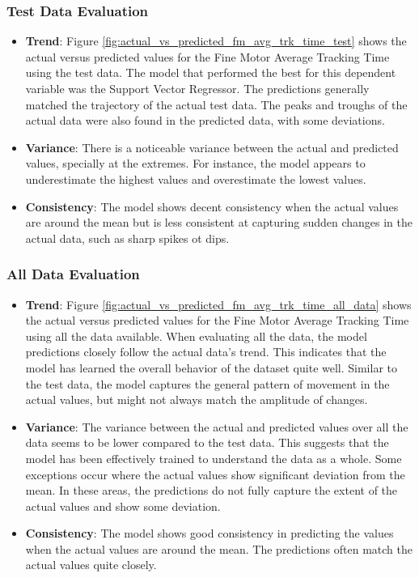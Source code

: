 \subsubsection*{Test Data Evaluation}

\begin{itemize}
    \item \textbf{Trend}: Figure \ref{fig:actual_vs_predicted_fm_avg_trk_time_test} shows the actual versus predicted values for the Fine Motor Average Tracking Time using the test data. The model that performed
          the best for this dependent variable was the Support Vector Regressor. The predictions generally matched the trajectory of the actual test data. The peaks and troughs of the
          actual data were also found in the predicted data, with some deviations.
    \item \textbf{Variance}: There is a noticeable variance between the actual and predicted values, specially at the extremes. For instance, the model appears to underestimate the highest values
          and overestimate the lowest values.
    \item \textbf{Consistency}: The model shows decent consistency when the actual values are around the mean but is less consistent at capturing sudden changes in the actual data, such as sharp spikes ot dips.
\end{itemize}

\subsubsection*{All Data Evaluation}

\begin{itemize}
    \item \textbf{Trend}: Figure \ref{fig:actual_vs_predicted_fm_avg_trk_time_all_data} shows the actual versus predicted values for the Fine Motor Average Tracking Time using all the data
          available. When evaluating all the data, the model predictions closely follow the actual data's trend. This indicates that the model has learned the overall behavior of the dataset quite well.
          Similar to the test data, the model captures the general pattern of movement in the actual values, but might not always match the amplitude of changes.
    \item \textbf{Variance}: The variance between the actual and predicted values over all the data seems to be lower compared to the test data. This suggests that the model has been
          effectively trained to understand the data as a whole. Some exceptions occur where the actual values show significant deviation from the mean. In these areas, the predictions do not fully
          capture the extent of the actual values and show some deviation.
    \item \textbf{Consistency}: The model shows good consistency in predicting the values when the actual values are around the mean. The predictions often match the actual values quite closely.
\end{itemize}

